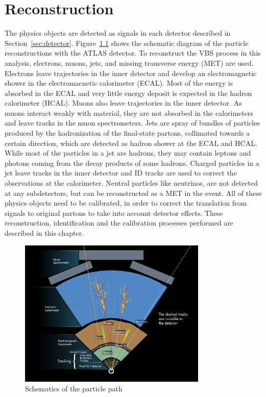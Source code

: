 \chapter{Reconstruction}
\label{chap:reconstruction}
The physics objects are detected as signals in each detector described in Section~\ref{sec:detector}.
Figure~\ref{fig:ParticlePath} shows the schematic diagram of the particle reconstructions with the ATLAS detector. 
To reconstruct the VBS process in this analysis, electrons, muons, jets, and missing transverse energy (MET) are used.
Electrons leave trajectories in the inner detector and develop an electromagnetic shower in the electromacnetic calorimeter (ECAL). 
Most of the energy is absorbed in the ECAL and very little energy deposit is expected in the hadron calorimeter (HCAL).
Muons also leave trajectories in the inner detector.
As muons interact weakly with material, they are not absorbed in the calorimeters and leave tracks in the muon spectrometers.
Jets are spray of bundles of particles produced by the hadronization of the final-state partons, collimated towards a certain direction, which are detected as hadron shower at the ECAL and HCAL. While most of the particles in a jet are hadrons, they may contain leptons and photons coming from the decay products of some hadrons. 
Charged particles in a jet leave tracks in the inner detector and ID tracks are used to correct the observations at the calorimeter. Neutral particles like neutrinos, are not detected at any subdetectors, but can be reconstructed as a MET in the event.
All of these physics objects need to be calibrated, in order to correct the translation from signals to original partons to take into account detector effects.
These reconstruction, identification and the calibration processes performed are described in this chapter.

\begin{figure}[tbp]
\begin{center}
 \includegraphics[width=0.80\textwidth,keepaspectratio]{figures/Reconstruction/ParticlePath}
\caption{
Schematics of the particle path
}
\label{fig:ParticlePath}
\end{center}
\end{figure}
